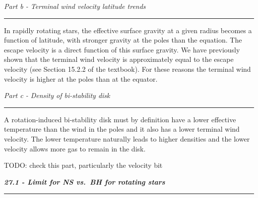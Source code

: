\documentclass[12pt, letterpaper, twoside]{article}
\newcommand{\question}[1]{{\noindent \it #1}}
\newcommand{\answer}[1]{
    \par\noindent\rule{\textwidth}{0.4pt}#1\vspace{0.5cm}
}
\newcommand{\todo}[1]{{\color{red}\begin{center}TODO: #1\end{center}}}
\begin{document}
\question{Part b - Terminal wind velocity latitude trends}
\answer{
    In rapidly rotating stars, the effective surface gravity at a given radius becomes a function of latitude, with stronger gravity at the poles than the equation. The escape velocity is a direct function of this surface gravity. We have previously shown that the terminal wind velocity is approximately equal to the escape velocity (see Section 15.2.2 of the textbook). For these reasons the terminal wind velocity is higher at the poles than at the equator.
}

\question{Part c - Density of bi-stability disk}
\answer{
    A rotation-induced bi-stability disk must by definition have a lower effective temperature than the wind in the poles and it also has a lower terminal wind velocity. The lower temperature naturally leads to higher densities and the lower velocity allows more gas to remain in the disk.
    \todo{check this part, particularly the velocity bit}
}

\question{\textbf{27.1 - Limit for NS vs.\ BH for rotating stars}}
\answer{}
\end{document}

